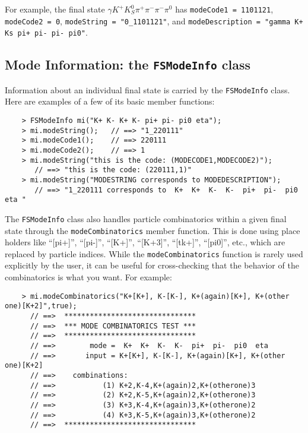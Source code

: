 \documentclass[11pt]{article}
\begin{document}
For example, the final state $\gamma K^+ K^0_S \pi^+ \pi^- \pi^- \pi^0$ has {\tt modeCode1 = 1101121}, {\tt modeCode2 = 0}, {\tt modeString = "0\_1101121"}, and {\tt modeDescription = "gamma K+ Ks pi+ pi- pi- pi0"}. 

\subsection{Mode Information: the {\tt FSModeInfo} class}
\label{sec:modeinfo}

Information about an individual final state is carried by the {\tt FSModeInfo} class.  Here are examples of a few of its basic member functions:
\begin{verbatim}
    > FSModeInfo mi("K+ K- K+ K- pi+ pi- pi0 eta");
    > mi.modeString();   // ==> "1_220111"
    > mi.modeCode1();    // ==> 220111
    > mi.modeCode2();    // ==> 1
    > mi.modeString("this is the code: (MODECODE1,MODECODE2)");
       // ==> "this is the code: (220111,1)" 
    > mi.modeString("MODESTRING corresponds to MODEDESCRIPTION");
       // ==> "1_220111 corresponds to  K+  K+  K-  K-  pi+  pi-  pi0  eta "
\end{verbatim}

The {\tt FSModeInfo} class also handles particle combinatorics within a given final state through the {\tt modeCombinatorics} member function.  This is done using place holders like ``[pi+]'', ``[pi-]'', ``[K+]'', ``[K+3]'', ``[tk+]'', ``[pi0]'', etc., which are replaced by particle indices.  While the {\tt modeCombinatorics} function is rarely used explicitly by the user, it can be useful for cross-checking that the behavior of the combinatorics is what you want. For example:
\begin{verbatim}
    > mi.modeCombinatorics("K+[K+], K-[K-], K+(again)[K+], K+(other one)[K+2]",true);
      // ==>  *******************************
      // ==>  *** MODE COMBINATORICS TEST ***
      // ==>  *******************************
      // ==>        mode =  K+  K+  K-  K-  pi+  pi-  pi0  eta 
      // ==>       input = K+[K+], K-[K-], K+(again)[K+], K+(other one)[K+2]
      // ==>    combinations:
      // ==>           (1) K+2,K-4,K+(again)2,K+(otherone)3
      // ==>           (2) K+2,K-5,K+(again)2,K+(otherone)3
      // ==>           (3) K+3,K-4,K+(again)3,K+(otherone)2
      // ==>           (4) K+3,K-5,K+(again)3,K+(otherone)2
      // ==>  *******************************
\end{verbatim}
\end{document}
